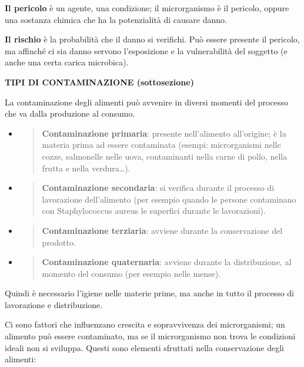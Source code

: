 \documentclass[]{article}
\begin{document}
\textbf{Il pericolo} è un agente, una condizione; il microrganismo è il
pericolo, oppure una sostanza chimica che ha la potenzialità di causare
danno.

\textbf{Il rischio} è la probabilità che il danno si verifichi. Può
essere presente il pericolo, ma affinché ci sia danno servono
l'esposizione e la vulnerabilità del soggetto (e anche una certa carica
microbica).

\textbf{TIPI DI CONTAMINAZIONE (sottosezione)}

La contaminazione degli alimenti può avvenire in diversi momenti del
processo che va dalla produzione al consumo.

\begin{itemize}
\item
  \begin{quote}
  \textbf{Contaminazione primaria}: presente nell'alimento all'origine;
  è la materia prima ad essere contaminata (esempi: microrganismi nelle
  cozze, salmonelle nelle uova, contaminanti nella carne di pollo, nella
  frutta e nella verdura\ldots{}).
  \end{quote}
\item
  \begin{quote}
  \textbf{Contaminazione secondaria}: si verifica durante il processo di
  lavorazione dell'alimento (per esempio quando le persone contaminano
  con Staphylococcus aureus le superfici durante le lavorazioni).
  \end{quote}
\item
  \begin{quote}
  \textbf{Contaminazione terziaria}: avviene durante la conservazione
  del prodotto.
  \end{quote}
\item
  \begin{quote}
  \textbf{Contaminazione quaternaria}: avviene durante la distribuzione,
  al momento del consumo (per esempio nelle mense).
  \end{quote}
\end{itemize}

Quindi è necessario l'igiene nelle materie prime, ma anche in tutto il
processo di lavorazione e distribuzione.

Ci sono fattori che influenzano crescita e sopravvivenza dei
microrganismi; un alimento può essere contaminato, ma se il
microrganismo non trova le condizioni ideali non si sviluppa. Questi
sono elementi sfruttati nella conservazione degli alimenti:
\end{document}
